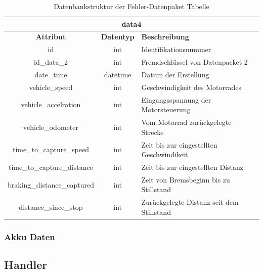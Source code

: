 \begin{table}[H]
	\begin{center}
		\begin{tabular}{|c|c|l|}
			\hline
			\multicolumn{3}{|c|}{\textbf{data4}} \\ \hline
			\textbf{Attribut}           & \textbf{Datentyp} & \textbf{Beschreibung}                     \\ \hline
			id                          & int               & Identifikationsnummer                     \\ \hline
			id\_data\_2                 & int               & Fremdschlüssel von Datenpacket 2          \\ \hline
			date\_time                  & datetime          & Datum der Erstellung                      \\ \hline
			vehicle\_speed              & int               & Geschwindigkeit des Motorrades            \\ \hline
			vehicle\_accelration        & int               & Eingangsspannung der Motorsteuerung       \\ \hline
			vehicle\_odometer           & int               & Vom Motorrad zurückgelegte Strecke        \\ \hline
			time\_to\_capture\_speed    & int               & Zeit bis zur eingestellten Geschwindikeit \\ \hline
			time\_to\_capture\_distance & int               & Zeit bis zur eingestellten Distanz        \\ \hline
			braking\_distance\_captured & int               & Zeit von Bremsbeginn bis zu Stillstand     \\ \hline
			distance\_since\_stop       & int               & Zurückgelegte Distanz seit dem Stillstand \\ \hline
		\end{tabular}
		\caption{Datenbankstruktur der Fehler-Datenpaket Tabelle}
		\label{tab:data4}
	\end{center}
\end{table}

\subsubsection{Akku Daten}

\subsection{Handler}

